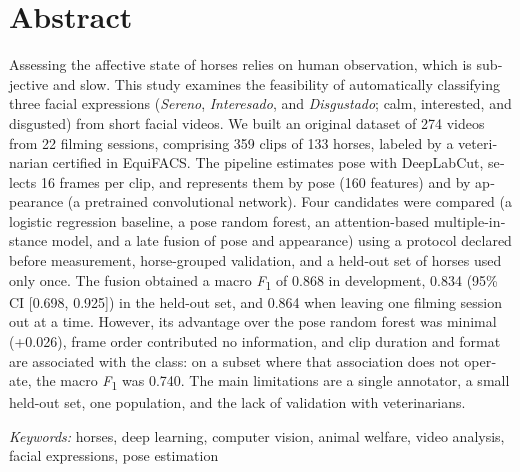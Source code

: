 \chapter*{Abstract}
\begin{otherlanguage}{english}
\noindent Assessing the affective state of horses relies on human observation, which is subjective and slow. This study examines the feasibility of automatically classifying three facial expressions (\textit{Sereno}, \textit{Interesado}, and \textit{Disgustado}; calm, interested, and disgusted) from short facial videos. We built an original dataset of 274 videos from 22 filming sessions, comprising 359 clips of 133 horses, labeled by a veterinarian certified in EquiFACS. The pipeline estimates pose with DeepLabCut, selects 16 frames per clip, and represents them by pose (160 features) and by appearance (a pretrained convolutional network). Four candidates were compared (a logistic regression baseline, a pose random forest, an attention-based multiple-instance model, and a late fusion of pose and appearance) using a protocol declared before measurement, horse-grouped validation, and a held-out set of horses used only once. The fusion obtained a macro \textit{F}\textsubscript{1} of 0.868 in development, 0.834 (95\% CI [0.698, 0.925]) in the held-out set, and 0.864 when leaving one filming session out at a time. However, its advantage over the pose random forest was minimal (+0.026), frame order contributed no information, and clip duration and format are associated with the class: on a subset where that association does not operate, the macro \textit{F}\textsubscript{1} was 0.740. The main limitations are a single annotator, a small held-out set, one population, and the lack of validation with veterinarians.

\medskip
\noindent\hspace{1.27cm}\textit{Keywords:} horses, deep learning, computer vision, animal welfare, video analysis, facial expressions, pose estimation
\end{otherlanguage}

\clearpage
